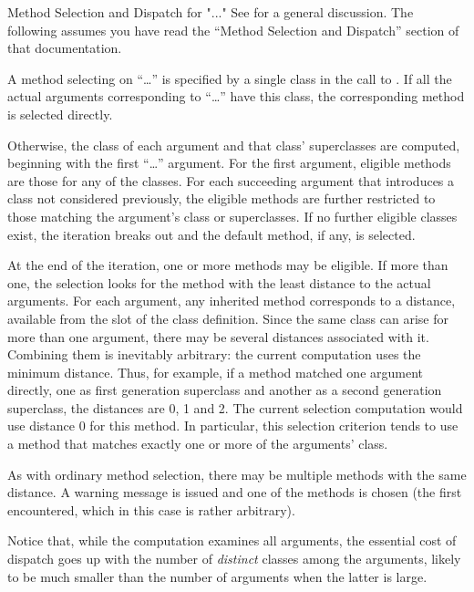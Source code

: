 \begin{Section}{Method Selection and Dispatch for "..."}
See  for a general discussion.  The following assumes
you have read the ``Method Selection and Dispatch'' section of
that documentation.

A method selecting on ``\dots'' is specified by a single class in the
call to .  If all the actual arguments
corresponding to ``\dots'' have this class, the corresponding method is
selected directly.

Otherwise, the class of each argument and that class' superclasses are
computed, beginning with the first ``\dots'' argument.  For the first
argument, eligible methods are those for any of the classes.   For
each succeeding argument that introduces a class not considered previously, the eligible methods are further
restricted to those matching the argument's class or
superclasses. If no further eligible classes exist, the iteration
breaks out and the default method, if any, is selected.

At the end of the iteration, one or more methods may be eligible.
If more than one, the selection looks for the method with the least
distance to the actual arguments.  For each argument, any inherited
method corresponds to a distance, available from the 
slot of the class definition.  Since the same class can arise for
more than one argument, there may be several distances associated
with it.  Combining them is inevitably arbitrary:  the current
computation uses the minimum distance.  Thus, for example, if a
method matched one argument directly, one as  first generation
superclass and another as a second generation superclass, the
distances are 0, 1 and 2.  The current selection computation would
use distance 0 for this
method.  In particular, this selection criterion tends to use a method that
matches exactly one or more of the arguments' class.

As with ordinary method selection, there may be multiple methods
with the same distance.  A warning  message is issued and one of the
methods is chosen (the first encountered, which in this case is
rather arbitrary).

Notice that, while the computation examines all arguments, the
essential cost of dispatch goes up with the number of
\emph{distinct} classes among the arguments, likely to be much
smaller than the number of arguments when the latter is large.

\end{Section}
